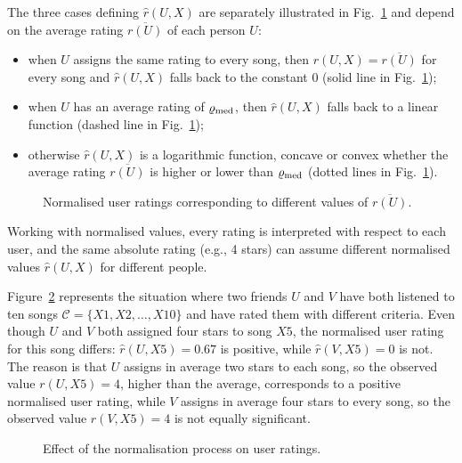 The three cases defining $\widehat{r}(U,X)$ are separately illustrated in Fig.~\ref{fig:normalisation_function} and depend on the average rating $\overline{r(U)}$ of each person $U$:
\begin{itemize}
 \item when $U$ assigns the same rating to every song, then 
$r(U,X) = \overline{r(U)}$ for every song and $\widehat{r}(U,X)$ falls back to the constant $0$ (solid line in Fig.~\ref{fig:normalisation_function});
 \item when $U$ has an average rating of $\varrho_{\operatorname{med}}$, then $\widehat{r}(U,X)$ falls back to a linear function (dashed line in Fig.~\ref{fig:normalisation_function}); %
 \item otherwise $\widehat{r}(U,X)$ is a logarithmic function, concave or convex whether the average rating $\overline{r(U)}$ is higher or lower than $\varrho_{\operatorname{med}}$ (dotted lines in Fig.~\ref{fig:normalisation_function}). 
\end{itemize}
%
\begin{figure}[bthp]
\centering \setlength{\abovecaptionskip}{3pt}
\caption{Normalised user ratings corresponding to different values of $\overline{r(U)}$.}
\label{fig:normalisation_function}
\end{figure}
Working with normalised values, every rating is interpreted with respect to each user, and the same absolute rating (e.g., 4 stars) can assume different normalised values $\widehat{r}(U,X)$ for different people.

\begin{example}
Figure~\ref{fig:compared_normalisation} represents the situation where two friends $U$ and $V$ have both listened to ten songs $\mathcal{C} = \{X1, X2, \ldots, X10\}$ and have rated them with different criteria.
Even though $U$ and $V$ both assigned four stars to song $X5$, the normalised user rating for this song differs: $\widehat{r}(U,X5) = 0.67$ is positive, while $\widehat{r}(V,X5) = 0$ is not.
The reason is that $U$ assigns in average two stars to each song, so the observed value $r(U,X5) = 4$, higher than the average, corresponds to a positive normalised user rating, while $V$ assigns in average four stars to every song, so the observed value $r(V,X5) = 4$ is not equally significant.
%
\begin{figure}[bthp]
\centering \setlength{\abovecaptionskip}{3pt}
\caption{Effect of the normalisation process on user ratings.}
\label{fig:compared_normalisation}
\end{figure}
        
\end{example}

